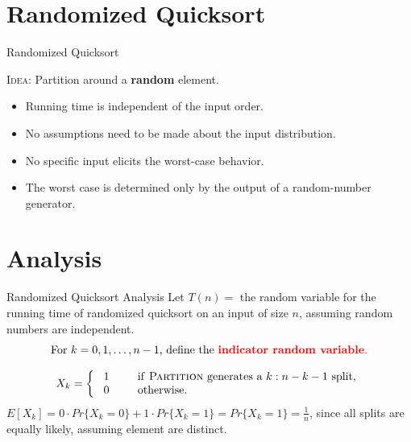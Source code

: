 \documentclass{beamer}
\begin{document}
\section{Randomized Quicksort}

\begin{frame}{Randomized Quicksort}
    \begin{alertblock}{\textsc{Idea:}}
        Partition around a \textbf{random} element.
    \end{alertblock}
    \begin{itemize}
        \item Running time is independent of the input order.
        \item No assumptions need to be made about the input distribution.
        \item No specific input elicits the worst-case behavior.
        \item The worst case is determined only by the output of a random-number generator.
    \end{itemize}
\end{frame}

\section{Analysis}

\begin{frame}{Randomized Quicksort Analysis}
    Let $T(n) = $ the random variable for the running time of randomized quicksort on an input of size $n$, assuming random numbers are independent.
    $$
        \text{For } k = 0, 1, \ldots, n - 1\text{, define the \textcolor{red}{\textbf{indicator random variable}.}}
    $$

    $$
        X_k = \left\{
            \begin{array}{l l}
                \text{ 1 \text{\hspace{3mm}}} & \text{ if \textsc{Partition} generates a } k: n-k-1 \text{ split,} \\
                \text{ 0 \text{\hspace{3mm}}} & \text{ otherwise.} \\
            \end{array}
        \right.
    $$
    \pause
    $E[X_k] = 0 \cdot Pr\{X_k = 0\} + 1 \cdot Pr\{X_k = 1\} = Pr\{X_k = 1\} = \frac{1}{n}$, since all splits are equally likely, assuming element are distinct.
\end{frame}
\end{document}
